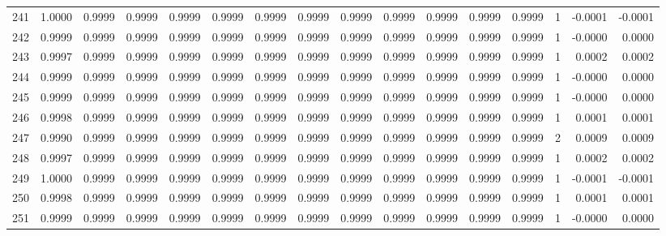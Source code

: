 \begin{tabular}{lrrrrrrrrrrrrrrr}
241 &      1.0000 &  0.9999 &  0.9999 &  0.9999 &  0.9999 &  0.9999 &  0.9999 &  0.9999 &  0.9999 &  0.9999 &   0.9999 &     0.9999 &      1 &                   -0.0001 &                    -0.0001 \\
242 &      0.9999 &  0.9999 &  0.9999 &  0.9999 &  0.9999 &  0.9999 &  0.9999 &  0.9999 &  0.9999 &  0.9999 &   0.9999 &     0.9999 &      1 &                   -0.0000 &                     0.0000 \\
243 &      0.9997 &  0.9999 &  0.9999 &  0.9999 &  0.9999 &  0.9999 &  0.9999 &  0.9999 &  0.9999 &  0.9999 &   0.9999 &     0.9999 &      1 &                    0.0002 &                     0.0002 \\
244 &      0.9999 &  0.9999 &  0.9999 &  0.9999 &  0.9999 &  0.9999 &  0.9999 &  0.9999 &  0.9999 &  0.9999 &   0.9999 &     0.9999 &      1 &                   -0.0000 &                     0.0000 \\
245 &      0.9999 &  0.9999 &  0.9999 &  0.9999 &  0.9999 &  0.9999 &  0.9999 &  0.9999 &  0.9999 &  0.9999 &   0.9999 &     0.9999 &      1 &                   -0.0000 &                     0.0000 \\
246 &      0.9998 &  0.9999 &  0.9999 &  0.9999 &  0.9999 &  0.9999 &  0.9999 &  0.9999 &  0.9999 &  0.9999 &   0.9999 &     0.9999 &      1 &                    0.0001 &                     0.0001 \\
247 &      0.9990 &  0.9999 &  0.9999 &  0.9999 &  0.9999 &  0.9999 &  0.9999 &  0.9999 &  0.9999 &  0.9999 &   0.9999 &     0.9999 &      2 &                    0.0009 &                     0.0009 \\
248 &      0.9997 &  0.9999 &  0.9999 &  0.9999 &  0.9999 &  0.9999 &  0.9999 &  0.9999 &  0.9999 &  0.9999 &   0.9999 &     0.9999 &      1 &                    0.0002 &                     0.0002 \\
249 &      1.0000 &  0.9999 &  0.9999 &  0.9999 &  0.9999 &  0.9999 &  0.9999 &  0.9999 &  0.9999 &  0.9999 &   0.9999 &     0.9999 &      1 &                   -0.0001 &                    -0.0001 \\
250 &      0.9998 &  0.9999 &  0.9999 &  0.9999 &  0.9999 &  0.9999 &  0.9999 &  0.9999 &  0.9999 &  0.9999 &   0.9999 &     0.9999 &      1 &                    0.0001 &                     0.0001 \\
251 &      0.9999 &  0.9999 &  0.9999 &  0.9999 &  0.9999 &  0.9999 &  0.9999 &  0.9999 &  0.9999 &  0.9999 &   0.9999 &     0.9999 &      1 &                   -0.0000 &                     0.0000 \\

\end{tabular}
